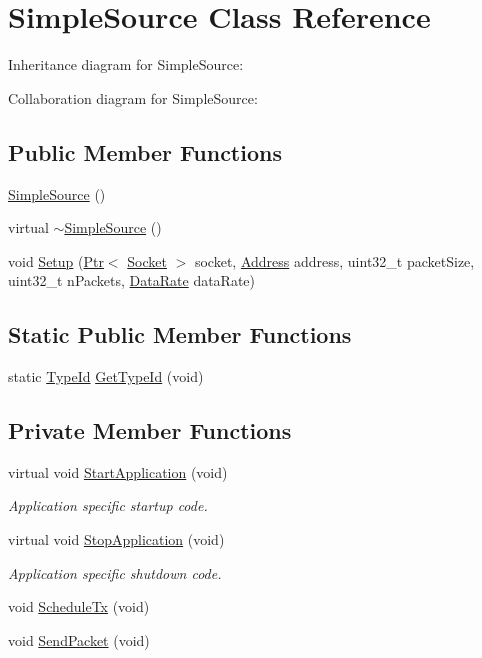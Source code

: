 \hypertarget{classSimpleSource}{}\section{Simple\+Source Class Reference}
\label{classSimpleSource}


Inheritance diagram for Simple\+Source\+:


Collaboration diagram for Simple\+Source\+:
\subsection*{Public Member Functions}
\begin{DoxyCompactItemize}
\item 
\hyperlink{classSimpleSource_ac1a610af53fcdfad08a3db9abbc8cd13}{Simple\+Source} ()
\item 
virtual \hyperlink{classSimpleSource_aadac4a976478227382320d0e0147d522}{$\sim$\+Simple\+Source} ()
\item 
void \hyperlink{classSimpleSource_aa6ca35f5717073eccd278f9afa3d41d5}{Setup} (\hyperlink{classns3_1_1Ptr}{Ptr}$<$ \hyperlink{classns3_1_1Socket}{Socket} $>$ socket, \hyperlink{classns3_1_1Address}{Address} address, uint32\+\_\+t packet\+Size, uint32\+\_\+t n\+Packets, \hyperlink{classns3_1_1DataRate}{Data\+Rate} data\+Rate)
\end{DoxyCompactItemize}
\subsection*{Static Public Member Functions}
\begin{DoxyCompactItemize}
\item 
static \hyperlink{classns3_1_1TypeId}{Type\+Id} \hyperlink{classSimpleSource_a06d249cbbbc7cbab70853a3cec6ad04e}{Get\+Type\+Id} (void)
\end{DoxyCompactItemize}
\subsection*{Private Member Functions}
\begin{DoxyCompactItemize}
\item 
virtual void \hyperlink{classSimpleSource_a081ae355f30d29afa055f20a1c7c9896}{Start\+Application} (void)
\begin{DoxyCompactList}\small\item\em Application specific startup code. \end{DoxyCompactList}\item 
virtual void \hyperlink{classSimpleSource_aa336bf31214e9048bf3248e5dfef5e4f}{Stop\+Application} (void)
\begin{DoxyCompactList}\small\item\em Application specific shutdown code. \end{DoxyCompactList}\item 
void \hyperlink{classSimpleSource_ae3e167b005ac1ba95c7c5e6f4fc5ff99}{Schedule\+Tx} (void)
\item 
void \hyperlink{classSimpleSource_ae1b5c282b00b2e06301c5b8659082cd1}{Send\+Packet} (void)
\end{DoxyCompactItemize}
